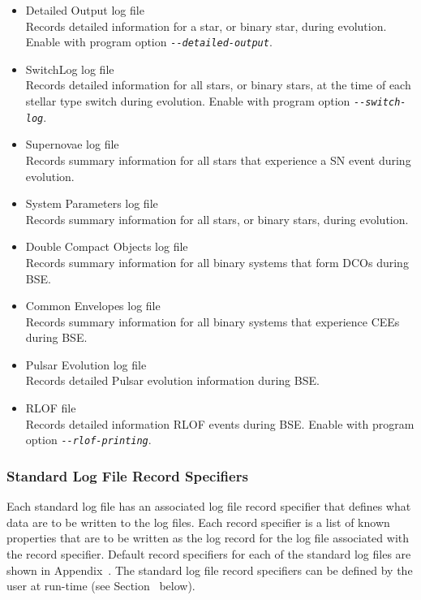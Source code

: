 \begin{itemize}
\itemsep0pt
\item{Detailed Output log file \\ Records detailed information for a star, or binary star, during evolution. Enable with program option \textit{\texttt{-{}-{detailed-output}}}.}
\item{SwitchLog log file \\ Records detailed information for all stars, or binary stars, at the time of each stellar type switch during evolution. Enable with program option \textit{\texttt{-{}-{switch-log}}}.}
\item{Supernovae log file \\ Records summary information for all stars that experience a SN event during evolution.}
\item{System Parameters log file \\ Records summary information for all stars, or binary stars, during evolution.}
\item{Double Compact Objects log file \\ Records summary information for all binary systems that form DCOs during BSE.}
\item{Common Envelopes log file \\ Records summary information for all binary systems that experience CEEs during BSE.}
\item{Pulsar Evolution log file \\ Records detailed Pulsar evolution information during BSE.}
\item{RLOF file \\ Records detailed information RLOF events during BSE. Enable with program option \textit{\texttt{-{}-{rlof-printing}}}.}
\end{itemize}

\newpage
\subsubsection{Standard Log File Record Specifiers}\label{sec:StandardLogFileRecordSpecifiers}

Each standard log file has an associated log file record specifier that defines what data are to be written to the log files. Each record specifier is a list of known properties that are to be written as the log record for the log file associated with the record specifier. Default record specifiers for each of the standard log files are shown in Appendix~. The standard log file record specifiers can be defined by the user at run-time (see Section~ below).

